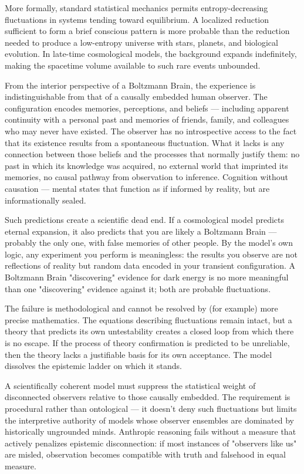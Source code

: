 More formally, standard statistical mechanics permits entropy-decreasing fluctuations in systems tending toward equilibrium. A localized reduction sufficient to form a brief conscious pattern is more probable than the reduction needed to produce a low-entropy universe with stars, planets, and biological evolution. In late-time cosmological models, the background expands indefinitely, making the spacetime volume available to such rare events unbounded.

From the interior perspective of a Boltzmann Brain, the experience is indistinguishable from that of a causally embedded human observer. The configuration encodes memories, perceptions, and beliefs — including apparent continuity with a personal past and memories of friends, family, and colleagues who may never have existed. The observer has no introspective access to the fact that its existence results from a spontaneous fluctuation. What it lacks is any connection between those beliefs and the processes that normally justify them: no past in which its knowledge was acquired, no external world that imprinted its memories, no causal pathway from observation to inference. Cognition without causation — mental states that function as if informed by reality, but are informationally sealed.

Such predictions create a scientific dead end. If a cosmological model predicts eternal expansion, it also predicts that you are likely a Boltzmann Brain — probably the only one, with false memories of other people. By the model's own logic, any experiment you perform is meaningless: the results you observe are not reflections of reality but random data encoded in your transient configuration. A Boltzmann Brain "discovering" evidence for dark energy is no more meaningful than one "discovering" evidence against it; both are probable fluctuations.

The failure is methodological and cannot be resolved by (for example) more precise mathematics. The equations describing fluctuations remain intact, but a theory that predicts its own untestability creates a closed loop from which there is no escape. If the process of theory confirmation is predicted to be unreliable, then the theory lacks a justifiable basis for its own acceptance. The model dissolves the epistemic ladder on which it stands.

A scientifically coherent model must suppress the statistical weight of disconnected observers relative to those causally embedded. The requirement is procedural rather than ontological — it doesn't deny such fluctuations but limits the interpretive authority of models whose observer ensembles are dominated by historically ungrounded minds. Anthropic reasoning fails without a measure that actively penalizes epistemic disconnection: if most instances of "observers like us" are misled, observation becomes compatible with truth and falsehood in equal measure.

